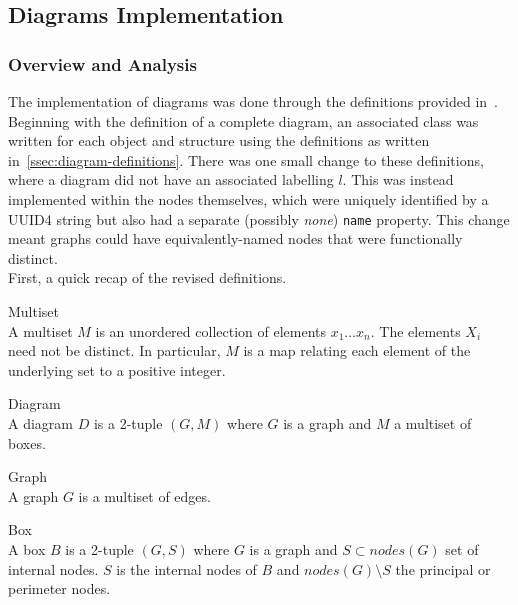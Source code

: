 \subsection{Diagrams Implementation}

    \subsubsection{Overview and Analysis}\label{sssec:diagram-implementation-analysis}
        The implementation of diagrams was done through the definitions provided in~\cite{solo-diagrams}.
        Beginning with the definition of a complete diagram, an associated class was written for each object and structure using the definitions as written in~\ref{ssec:diagram-definitions}.
        There was one small change to these definitions, where a diagram did not have an associated labelling $l$.
        This was instead implemented within the nodes themselves, which were uniquely identified by a UUID4 string but also had a separate (possibly \textit{none}) \texttt{name} property.
        This change meant graphs could have equivalently-named nodes that were functionally distinct. \\

        First, a quick recap of the revised definitions.

        \begin{definition}{Multiset\\}
            A multiset $M$ is an unordered collection of elements $x_1 \ldots x_n$.
            The elements $X_i$ need not be distinct.
            In particular, $M$ is a map relating each element of the underlying set to a positive integer.
        \end{definition}

        \begin{definition}{Diagram\\}
            A diagram $D$ is a 2-tuple $(G, M)$ where $G$ is a graph and $M$ a multiset of boxes.
        \end{definition}

        \begin{definition}{Graph\\}
            A graph $G$ is a multiset of edges.
        \end{definition}

        \begin{definition}{Box\\}
            A box $B$ is a 2-tuple $(G, S)$ where $G$ is a graph and $S \subset nodes(G)$ set of internal nodes.
            $S$ is the internal nodes of $B$ and $nodes(G) \setminus S$ the principal or perimeter nodes.
        \end{definition}


